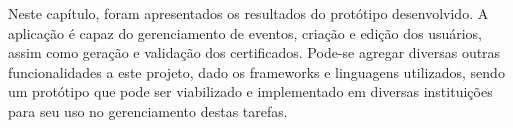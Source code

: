 Neste capítulo, foram apresentados os resultados do protótipo desenvolvido. A aplicação é capaz do gerenciamento de eventos, criação e edição dos usuários, assim como geração e validação dos certificados. Pode-se agregar diversas outras funcionalidades a este projeto, dado os frameworks e linguagens utilizados, sendo um protótipo que pode ser viabilizado e implementado em diversas instituições para seu uso no gerenciamento destas tarefas.
